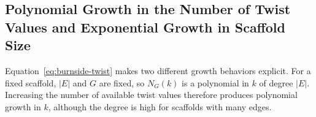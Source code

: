 \documentclass[acmtog]{acmart}
\begin{document}
\begin{table}[t]
\centering
\caption{ Numbers of symmetry-distinct edge-twist assignments for $k$ distinct twist values. Mirror-related configurations remain distinct because reflections reverse chirality. The examples include all five Platonic solids (with dual pairs grouped) and all five Wigner--Seitz cell types used in our periodic 3-honeycomb constructions. Large counts are shown in scientific notation.}
\label{tab:twist-enumeration}
\scriptsize
\setlength{\tabcolsep}{3pt}
\end{table}

\subsection{Polynomial Growth in the Number of Twist Values and Exponential Growth in Scaffold Size}

Equation~\eqref{eq:burnside-twist} makes two different growth behaviors explicit. For a fixed scaffold, $|E|$ and $G$ are fixed, so $N_G(k)$ is a polynomial in $k$ of degree $|E|$. Increasing the number of available twist values therefore produces polynomial growth in $k$, although the degree is high for scaffolds with many edges.
\end{document}
